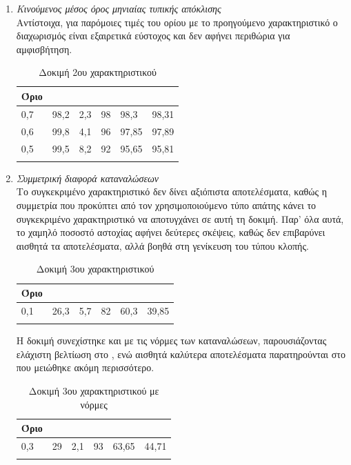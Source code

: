 \begin{enumerate}
\item{\textit{Κινούμενος μέσος όρος μηνιαίας τυπικής απόκλισης}} \\
Αντίστοιχα, για παρόμοιες τιμές του ορίου με το προηγούμενο χαρακτηριστικό ο διαχωρισμός είναι εξαιρετικά εύστοχος και δεν αφήνει περιθώρια για αμφισβήτηση.
\begin{center}
\begin{longtabu} to 0.8\textwidth { | X[c] || X[c] | X[c] | X[c] | X[c] | X[c] |  }
 \hline
  Όριο &   &  &  &  & \\
 ,7	&98,2	&2,3	&98	&98,3	&98,31\\
0,6	&99,8	&4,1	&96	&97,85	&97,89\\
0,5	&99,5	&8,2	&92	&95,65	&95,81\\
\hline
\caption{Δοκιμή 2ου χαρακτηριστικού}
\label{testfeat2}
\end{longtabu}
\end{center}
\item{\textit{Συμμετρική διαφορά καταναλώσεων}} \\
Το συγκεκριμένο χαρακτηριστικό δεν δίνει αξιόπιστα αποτελέσματα, καθώς η συμμετρία που προκύπτει από τον χρησιμοποιούμενο τύπο απάτης κάνει το συγκεκριμένο χαρακτηριστικό να αποτυγχάνει σε αυτή τη δοκιμή. Παρ' όλα αυτά, το χαμηλό ποσοστό αστοχίας αφήνει δεύτερες σκέψεις, καθώς δεν επιβαρύνει αισθητά τα αποτελέσματα, αλλά βοηθά στη γενίκευση του τύπου κλοπής. 
\begin{center}
\begin{longtabu} to 0.8\textwidth { | X[c] || X[c] | X[c] | X[c] | X[c] | X[c] |  }
 \hline
  Όριο &   &  &  &  & \\
 ,1&	26,3&	5,7&	82&	60,3&	39,85\\
\hline
\caption{Δοκιμή 3ου χαρακτηριστικού}
\label{testfeat3}
\end{longtabu}
\end{center}
Η δοκιμή συνεχίστηκε και με τις νόρμες των καταναλώσεων, παρουσιάζοντας ελάχιστη βελτίωση στο , ενώ αισθητά καλύτερα αποτελέσματα παρατηρούνται στο  που μειώθηκε ακόμη περισσότερο.
\begin{center}
\begin{longtabu} to 0.8\textwidth { | X[c] || X[c] | X[c] | X[c] | X[c] | X[c] |  }
 \hline
  Όριο &   &  &  &  & \\
 ,3&	29&	2,1&	93&	63,65&	44,71\\
\hline
\caption{Δοκιμή 3ου χαρακτηριστικού με νόρμες}
\label{testfeat3norms}
\end{longtabu}
\end{center}


\end{enumerate}
